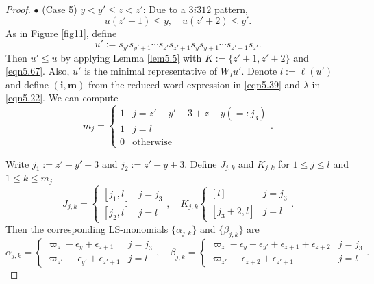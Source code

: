 \documentclass[12pt]{amsart}
\theoremstyle{definition}
\theoremstyle{remark}
\begin{document}
\begin{proof}
$\bullet$ (Case 5) $y < y' \leq z < z'$: Due to a $3i312$ pattern,
\begin{equation}\label{eqn5.67} 
u(z'+1) \leq y, \quad u(z'+2) \leq y'.
\end{equation}
As in Figure \ref{fig11}, define
\begin{equation}\label{eqn5.39}
u':=s_{y'}s_{y'+1} \cdots s_{z'}s_{z'+1} s_{y}s_{y+1} \cdots s_{z'-1}s_{z'}.
\end{equation}
Then $u' \leq u$ by applying Lemma \ref{lem5.5} with $K:=\{ z'+1 , z'+2 \}$ and \eqref{eqn5.67}. Also, $u'$ is the minimal representative of $W_Iu'$. Denote $l:= \ell (u')$ and define $(\mathbf{i}, \mathbf{m})$ from the reduced word expression in \eqref{eqn5.39} and $\lambda$ in \eqref{eqn5.22}. We can compute
\begin{equation}\label{eqn5.40}
m_j = 
\begin{cases}
1 & j = z'-y'+3 + z -y(=:j_3) \\
1 & j = l \\
0 & \text{otherwise}
\end{cases}
.
\end{equation}

Write $j_1:= z'-y'+3$ and $j_2:=z'-y+3$. Define $J_{j,k}$ and $K_{j,k}$ for $1\leq j \leq l$ and $1 \leq k \leq m_j$
\begin{equation}\label{eqn5.41}
J_{j,k} = 
\begin{cases}
[j_1,l] & j=j_3 \\
[j_2,l] & j = l
\end{cases}
, \quad K_{j,k}
\begin{cases}
[l]& j =j_3 \\
[j_3+2,l]& j =l
\end{cases}
.
\end{equation}
Then the corresponding LS-monomials $\{\alpha_{j,k}\}$ and $\{\beta_{j,k}\}$ are
\begin{equation}\label{eqn5.42}
\alpha_{j,k} = 
\begin{cases}
\varpi_{z}-\epsilon_y+\epsilon_{z+1} & j = j_3 \\
\varpi_{z'}-\epsilon_{y'}+\epsilon_{z'+1} & j=l 
\end{cases}
, \quad \beta_{j,k}=
\begin{cases}
\varpi_{z}-\epsilon_{y} - \epsilon_{y'} + \epsilon_{z+1}+\epsilon_{z+2} & j = j_3 \\
\varpi_{z'}-\epsilon_{z+2} + \epsilon_{z'+1} & j=l 
\end{cases}
.
\end{equation}


\end{proof}
\end{document}
